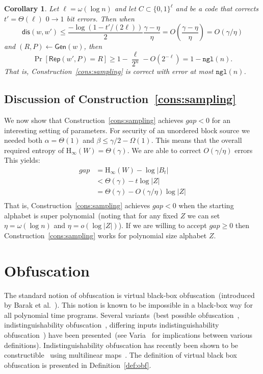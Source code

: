 \documentclass[11pt]{article}
\newcommand{\defref}[1]{\mbox{Definition~\ref{#1}}}
\newcommand{\consref}[1]{\mbox{Construction~\ref{#1}}}
\newcommand{\class}[1]{{\ensuremath{\mathsf{#1}}}}
\newcommand{\gen}{\ensuremath{\class{Gen}}\xspace}
\newcommand{\rep}{\ensuremath{\class{Rep}}\xspace}
\newcommand{\zo}{\ensuremath{\{0, 1\}}}
\newcommand{\dis}{\ensuremath{\mathsf{dis}}}
\newcommand{\ngl}{\ensuremath{\mathtt{ngl}}\xspace}
\newcommand{\Hoo}{\mathrm{H}_\infty}
\newtheorem{corollary}[theorem]{Corollary}
\begin{document}
\begin{corollary}
Let $\ell = \omega(\log n)$ and let $C\subset\zo^\ell$ and  be a code that corrects $t' = \Theta(\ell)$ $0\rightarrow 1$ bit errors.  Then when 
\[
\dis(w, w')\leq \frac{-\log(1-t'/(2\ell))}{2}\frac{\gamma-\eta}{\eta} = O(\frac{\gamma-\eta}{\eta}) = O(\gamma/\eta)
\] 
and $(R, P)\leftarrow \gen(w)$, then 
\[
\Pr[\rep( w', P) = R] \geq 1-\frac{\ell}{2^n} - O(2^{-\ell}) = 1-\ngl(n).
\]
That is, \consref{cons:sampling} is correct with error at most $\ngl(n)$.

\end{corollary}
\subsection{Discussion of \consref{cons:sampling}}
We now show that \consref{cons:sampling} achieves $gap<0$ for an interesting setting of parameters.  For security of an unordered block source we needed both $\alpha = \Theta(1)$ and $\beta\leq \gamma/2-\Omega(1)$.  This means that the overall required entropy of $\Hoo(W) = \Theta(\gamma)$.  We are able to correct $O(\gamma/\eta)$ errors
This yields:
\begin{align*}
gap &= \Hoo(W) -\log |B_t| \\
&< \Theta(\gamma)- t \log |Z|\\
&= \Theta(\gamma) - O(\gamma/\eta) \log |Z|\\
\end{align*}
That is, \consref{cons:sampling} achieves $gap<0$ when the starting alphabet is super polynomial~(noting that for any fixed $Z$ we can set $\eta = \omega(\log n)$ and $\eta = o(\log |Z|)$).  If we are willing to accept $gap\geq 0$ then \consref{cons:sampling} works for polynomial size alphabet $Z$.



\appendix
\section{Obfuscation}
\label{sec:obfuscation}
The standard notion of obfuscation is virtual black-box obfuscation~(introduced by Barak et al.~\cite{barak2001possibility}).  This notion is known to be impossible in a black-box way for all polynomial time programs.  Several variants~(best possible obfuscation~\cite{goldwasser2007best}, indistinguishability obfuscation~\cite{barak2001possibility}, differing inputs indistinguishability obfuscation~\cite{barak2001possibility}) have been presented~(see Varia~\cite{varia2010studies} for implications between various definitions).  Indistinguishability obfuscation has recently been shown to be constructible~\cite{garg2013candidate} using multilinear maps~\cite{garg2013multilinear}.  The definition of virtual black box obfuscation is presented in \defref{def:obf}.
\end{document}
